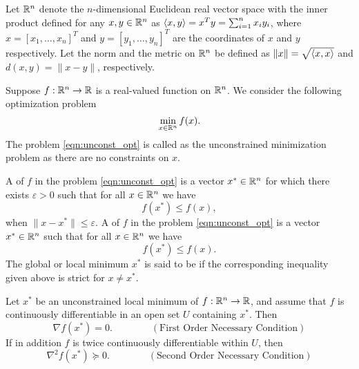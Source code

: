 \documentclass[11pt,a4paper]{article}
\begin{document}
Let $\mathbb{R}^n$ denote the $n$-dimensional Euclidean real vector space with the inner product defined for any $x,y\in \mathbb{R}^n$ as $\langle x, y \rangle = x^Ty = \sum_{i=1}^n x_i y_i$, where $x = [x_1,\ldots, x_n]^T$ and $y = [y_1,\ldots, y_n]^T$ are the coordinates of $x$ and $y$ respectively. Let the norm and the metric on $\mathbb{R}^n$ be defined as $\|x\| = \sqrt{\langle x, x \rangle}$ and $d(x,y) = \|x-y\|$, respectively.

Suppose $f:\mathbb{R}^n\rightarrow \mathbb{R}$ is a real-valued function on $\mathbb{R}^n$. We consider the following optimization problem 
\begin{equation}\label{eqn:unconst_opt}
    \min_{x\in\mathbb{R}^n} f(x).
\end{equation}
The problem \eqref{eqn:unconst_opt} is called as the unconstrained minimization problem as there are no constraints on $x$. 

\begin{definition}\label{def:optimal_points}
    A  of $f$ in the problem \eqref{eqn:unconst_opt} is a vector $x^*\in\mathbb{R}^n$ for which there exists $\varepsilon>0$ such that for all $x\in\mathbb{R}^n$ we have
    \begin{equation}\label{eqn:local_min}
        f(x^*)\le f(x),
    \end{equation}
    when $\|x-x^*\|\le \varepsilon$.
    A  of $f$ in the problem \eqref{eqn:unconst_opt} is a vector $x^*\in\mathbb{R}^n$ such that for all $x\in\mathbb{R}^n$ we have
    \begin{equation}\label{eqn:global_min}
        f(x^*)\le f(x).
    \end{equation}
    The global or local minimum $x^*$ is said to be  if the corresponding inequality given above is strict for $x\neq x^*$.
\end{definition}

\begin{proposition}
    Let $x^*$ be an unconstrained local minimum of $f:\mathbb{R}^n\rightarrow \mathbb{R}$, and assume that $f$ is continuously differentiable in an open set $U$ containing $x^*$. Then 
    \begin{equation*}
        \nabla f(x^*) = 0.\qquad\qquad (\text{First Order Necessary Condition})
    \end{equation*}
    If in addition $f$ is twice continuously differentiable within $U$, then
    \begin{equation*}
        \nabla^2 f(x^*) \succeq 0.\qquad\qquad (\text{Second Order Necessary Condition})
    \end{equation*}
\end{proposition}
    
\end{document}
